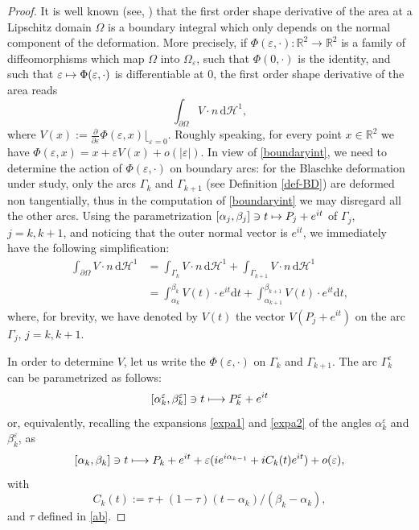 \documentclass[JEP,XML,SOM,Unicode,NoFloatCountersInSection]{cedram}
\let\mathcal\mathscr
\newcommand\mto{\mathchoice{\longmapsto}{\mapsto}{\mapsto}{\mapsto}}
\let\epsilon\varepsilon
\theoremstyle{plain}
\theoremstyle{definition}
\newcommand\de{\mathrm{d}}\let\dr\de
\let \e\epsilon
\let\B\Gamma
\begin{document}
\begin{proof}
It is well known (see, \eg \cite{HP}) that the first order shape derivative of the area at a Lipschitz domain $\Omega$ is a boundary integral which only depends on the normal component of the deformation.
More precisely, {if $\Phi(\e,\cdot):\mathbb R^2 \to \mathbb R^2$ is a family of diffeomorphisms which map $\Omega$ into $\Omega_\e$, such that $\Phi(0,\cdot)$ is the identity, and such that $\e \mto \Phi(\e, \cdot)$ is differentiable at $0$, the first order shape derivative of the area} reads
\begin{equation}\label{boundaryint}
\int_{\partial \Omega} V\cdot n \, \de \mathcal H^1,
\end{equation}
where {$V(x):=\frac{\partial}{\partial \e}\Phi(\e, x)\lfloor_{\e=0}$. Roughly speaking, for every point $x\in \mathbb R^2$ we have $\Phi(\e,x)=x + \e V(x) + o(|\e|)$. In view of \eqref{boundaryint}, we need to determine the action of $\Phi(\e,\cdot)$ on boundary arcs: for} the Blaschke deformation under study, {only the arcs} $\B_k$ and $\B_{k+1}$ (see Definition \ref{def-BD}) {are deformed non tangentially, thus in the computation of \eqref{boundaryint} we may disregard all the other arcs.} Using the parametrization $[\alpha_j, \beta_j]\ni t\mto P_j + e^{it}$ of $\B_j$, $j=k, k+1$, and noticing that the outer normal vector is $e^{it}$, we immediately have the following simplification:
\begin{equation}\label{shapeder}
\begin{split}
\int_{\partial \Omega} V\cdot n \, \de \mathcal H^1 &= \int_{\B_k} V \cdot n \, \de \mathcal H^1 + \int_{\B_{k+1}}V\cdot n \, \de \mathcal H^1\\
&= \int_{\alpha_k}^{\beta_k} V(t) \cdot e^{it} \de t+ \int_{\alpha_{k+1}}^{\beta_{k+1}} V(t)\cdot e^{it}\de t,
\end{split}
\end{equation}
where, for brevity, we have denoted by $V(t)$ the vector $V(P_j + e^{it})$ on the arc $\B_j$, $j=k, k+1$.

{In order to determine $V$, let us write the $\Phi(\e,\cdot)$ on $\B_{k}$ and $\B_{k+1}$. The arc $\B_{k}^\e$ can be parametrized as follows:
\[
[\alpha_k^\e,\beta_k^\e] \ni t \mto P_k^\e + e^{it}
\]
}
or, equivalently, recalling the expansions \eqref{expa1} and \eqref{expa2} of the angles $\alpha_k^\e$ and $\beta_k^\e$, as
{
\[
[\alpha_k,\beta_k] \ni t \mto P_k + e^{it} + \e ( i e^{i\alpha_{k-1}} + i C_k(t)e^{it}) + o(\e),
\]
}
with
\[
C_k(t):= \tau+ (1-\tau)(t-\alpha_k)/(\beta_k-\alpha_k),
\]
and $\tau$ defined in \eqref{ab}.


\end{proof}
\end{document}
